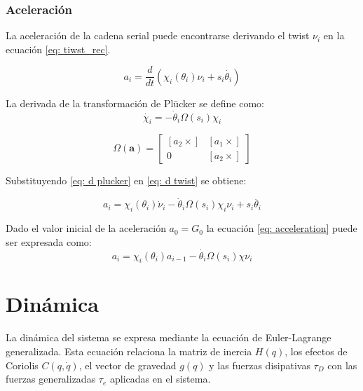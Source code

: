 \subsubsection{Aceleración}

La aceleración de la cadena serial puede 
encontrarse derivando el twist $\nu_i $ en la ecuación 
\eqref{eq: tiwst_rec}.

\begin{equation}\label{eq: d twist}
a_i = \frac{d}{dt} (\chi_i(\theta_i)\nu_i + s_i\dot{\theta_i})
\end{equation}

La derivada de la transformación de Plücker 
se define como:
\begin{equation}\label{eq: d plucker}
\dot{\chi_i} = -\dot \theta_i \Omega(s_i) \chi_i
\end{equation}

\begin{equation}\label{eq: Omega}
 \Omega(\mathbf a) = \begin{bmatrix}
           [a_2 \times] & [a_1 \times] \\
           0 & [a_2 \times]
          \end{bmatrix}
\end{equation}

Substituyendo \eqref{eq: d plucker} 
en \eqref{eq: d twist} se obtiene: 

\begin{equation}\label{eq: acceleration}
a_i = \chi_i(\theta_i)\dot{\nu}_i - \dot \theta_i \Omega(s_i)\chi_i \nu_i+ s_i\ddot{\theta_i}
\end{equation}

Dado el valor inicial de la aceleración 
$a_0 = G_0$ 
la ecuación \eqref{eq: acceleration} 
puede ser expresada como:
\begin{equation}
a_i = \chi_i(\theta_i) a_{i-1} - \dot{\theta_i}\Omega(s_i)\chi \nu_i
\end{equation}

\section{Dinámica}

La dinámica del sistema se expresa mediante la ecuación 
de Euler-Lagrange generalizada. 
Esta ecuación relaciona la matriz de inercia $H(q)$,
los efectos de Coriolis $C(q,\dot q)$, el vector de
gravedad $g(q)$ y las fuerzas disipativas $\tau_D$ con 
las fuerzas generalizadas $\tau_e$ aplicadas en el sistema.

